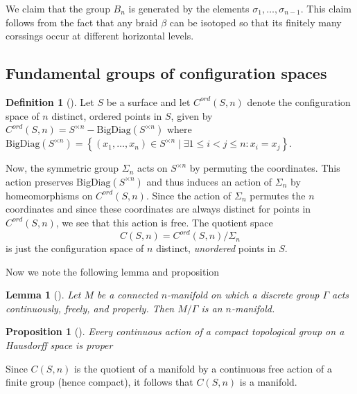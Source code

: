 \documentclass[reqno]{amsart}
\newtheorem{lemma}[theorem]{Lemma}
\newtheorem{proposition}[theorem]{Proposition}
\theoremstyle{definition}
\newtheorem{definition}[theorem]{Definition}
\theoremstyle{remark}
\begin{document}
We claim that the group $B_n$ is generated by
the elements $\sigma_1, \ldots, \sigma_{n-1}$.
This claim follows from the fact that any
braid $\beta$ can be isotoped so that
its finitely many corssings occur at different horizontal levels.

\subsection{Fundamental groups of configuration spaces}

\begin{definition}[]
    Let $S$ be a surface and let $C^{ord}(S,n)$ denote
    the configuration space of $n$ distinct, ordered
    points in $S$, given by
    $C^{ord} (S,n) = 
    S^{\times n} - \text{BigDiag}(S^{\times n})$
    where $\text{BigDiag}\left( S^{\times n} \right) 
    = \left\{ \left( 
    x_1, \ldots, x_n \right) \in 
 S^{\times n}  \mid \exists 1 \le i < j \le n \colon
x_i = x_j \right\} $.
\end{definition}


Now, the symmetric group $\Sigma_n$ acts on 
$S^{\times n}$ by permuting
the coordinates. This action preserves $\text{BigDiag}\left( 
 S^{\times n}\right) $ and thus induces an action
of $\Sigma_n$ by homeomorphisms on
$C^{ord}\left( S,n \right) $. Since the action of
$\Sigma_n$ permutes the $n$ coordinates and since
these coordinates are always distinct
for points in $C^{ord}\left( S,n \right) $, we see
that this action is free. The quotient space
\[
C \left( S,n \right) =
C^{ord}\left( S,n \right) / \Sigma_n
\] 
is just the configuration space of $n$ distinct,
\textit{unordered} points in $S$.


Now we note the following lemma \cite[Cor~12.27]{LeeTM}
and proposition \cite[Prop~12.22]{LeeTM}

\begin{lemma}[]
    Let $M$ be a connected $n$-manifold on which a discrete
    group $\Gamma$ acts continuously, freely, and properly.
    Then $M / \Gamma $ is an $n$-manifold.
\end{lemma}

\begin{proposition}[]
    Every continuous action of a compact topological group
    on a Hausdorff space is proper
\end{proposition}


Since $C\left( S,n \right) $ is the quotient of a
manifold by a continuous free action of a finite group (hence
compact),
it follows that $C\left( S,n \right) $ is a manifold.
\end{document}

